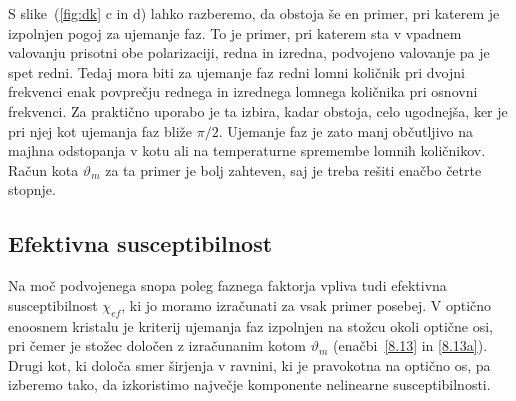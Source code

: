 S slike~(\ref{fig:dk} c in d) lahko razberemo, da obstoja še en primer, pri 
katerem je izpolnjen pogoj za ujemanje faz. To je primer, pri katerem sta v vpadnem
valovanju prisotni obe polarizaciji, redna in izredna, podvojeno valovanje pa
je spet redni. Tedaj mora biti za ujemanje faz redni lomni količnik
pri dvojni frekvenci enak povprečju rednega in izrednega lomnega količnika
pri osnovni frekvenci. Za praktično uporabo je ta izbira, kadar obstoja,
celo ugodnejša, ker je pri njej kot ujemanja faz bliže $\pi/2$. 
Ujemanje faz je zato manj občutljivo na majhna odstopanja v kotu ali na temperaturne
spremembe lomnih količnikov. Račun kota $\vartheta_m$ za ta primer je
bolj zahteven, saj je treba rešiti enačbo četrte stopnje.

\subsection*{Efektivna susceptibilnost}
Na moč podvojenega snopa poleg faznega faktorja vpliva tudi efektivna 
susceptibilnost $\chi_{ef}$, ki jo moramo izračunati za vsak primer posebej. 
V optično enoosnem kristalu
je kriterij ujemanja faz izpolnjen na stožcu okoli optične osi, pri čemer je stožec določen 
z izračunanim kotom $\vartheta_m$ (enačbi~\ref{8.13} in \ref{8.13a}). 
Drugi kot, ki določa smer širjenja v ravnini, ki je pravokotna na optično os, pa 
izberemo tako, da izkoristimo največje komponente nelinearne 
susceptibilnosti. 

